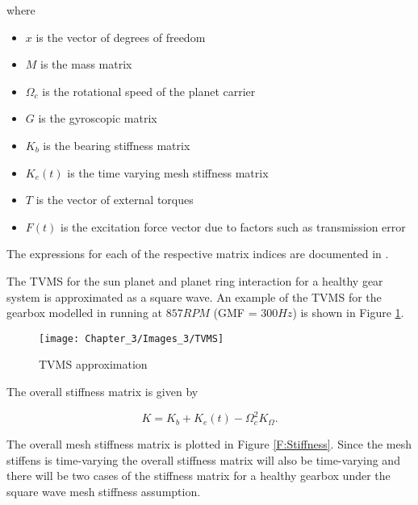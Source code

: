 where 
\begin{itemize}
	\item $x$ is the vector of degrees of freedom
	\item $M$ is the mass matrix
	\item $\Omega_{c}$ is the rotational speed of the planet carrier
	\item $G$ is the gyroscopic matrix 
	\item $K_{b}$ is the bearing stiffness matrix
	\item $K_{e}(t)$ is the time varying mesh stiffness matrix
	\item $T$ is the vector of external torques
	\item $F(t)$ is the excitation force vector due to factors such as transmission error        
\end{itemize}

The expressions for each of the respective matrix indices are documented in \cite{Chaari2006}.


The TVMS for the sun planet and planet ring interaction for a healthy gear system is approximated as a square wave. An example of the TVMS for the gearbox modelled in \cite{Chaari2006} running at $857RPM$ (GMF = $300Hz$) is shown in Figure \ref{F:TVMS}.


\begin{figure}[H]
	\centering
	\texttt{[image: Chapter\_3/Images\_3/TVMS]}
	\caption{TVMS approximation}
	\label{F:TVMS}
\end{figure}


The overall stiffness matrix is given by

\begin{equation}
K = K_{b}+K_{e}(t)-\Omega_{c}^{2} K_{\Omega}.
\end{equation}

The overall mesh stiffness matrix is plotted in Figure \ref{F:Stiffness}. Since the mesh stiffens is time-varying the overall stiffness matrix will also be time-varying and there will be two cases of the stiffness matrix for a healthy gearbox under the square wave mesh stiffness assumption. 

